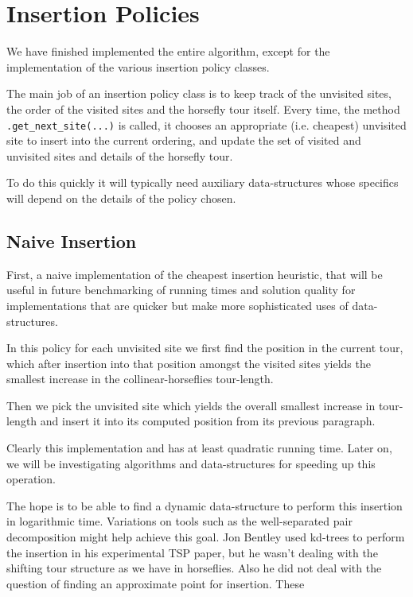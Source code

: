 \documentclass[11.5pt]{report}
\begin{document}
\section{Insertion Policies} 
\label{subsec:insertion-policies}

We have finished implemented the entire algorithm, except 
for the implementation of the various insertion policy classes. 

The main job of an insertion policy class is to keep track 
of the  unvisited sites,  the order of the visited sites and the 
horsefly tour itself. Every time, the method \verb|.get_next_site(...)| is called, it 
chooses an appropriate (i.e. cheapest) unvisited site to insert 
into the current ordering, and update the set of visited and unvisited sites
and details of the horsefly tour.  

To do this quickly it will typically need auxiliary data-structures whose specifics 
will depend on the details of the policy chosen. 

\subsection{Naive Insertion} \quad First, a naive implementation
  of the cheapest insertion heuristic, that will be useful in future
  benchmarking of running times and solution quality for implementations 
  that are quicker but make more sophisticated uses of data-structures. 

  In this policy for each unvisited site we first find the 
  position in the current tour, which after insertion into that position
  amongst the visited sites yields the smallest increase in the 
  collinear-horseflies tour-length. 

  Then we pick the unvisited site which yields the overall smallest 
  increase in tour-length and insert it into its computed position
  from its previous paragraph. 
     
  Clearly this implementation and has at least quadratic running time. 
  Later on, we will be investigating algorithms and data-structures 
  for speeding up this operation. 

  The hope is to be able to find a dynamic data-structure to perform this 
  insertion in logarithmic time. Variations on tools such as the well-separated pair 
  decomposition might help achieve this goal. Jon Bentley
  used kd-trees to perform the insertion in his experimental TSP
  paper, but he wasn't dealing with the shifting tour structure
  as we have in horseflies. Also he did not deal with the question 
  of finding an approximate point for insertion. These 
\end{document}
